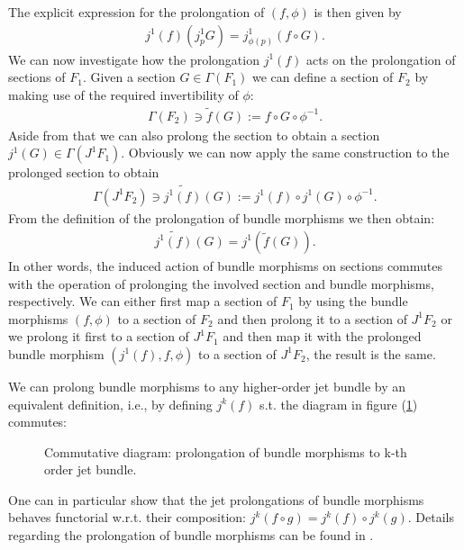 \documentclass[a4paper,12pt, DIV=14, BCOR=5mm, twoside, headsepline, numbers=noenddot]{scrbook}
\begin{document}
The explicit expression for the prolongation of $(f,\phi)$ is then given by
\begin{align}
    j^1(f)(j^1_pG) = j^1_{\phi(p)}(f\circ G).
\end{align}
We can now investigate how the prolongation $j^1(f)$ acts on the prolongation of sections of $F_1$.
Given a section $G \in \Gamma(F_1)$ we can define a section of $F_2$ by making use of the required invertibility of $\phi$: 
\begin{align}
\Gamma(F_2) \ni \widetilde{f}(G) := f \circ G \circ \phi^{-1}.
\end{align}
Aside from that we can also prolong the section to obtain a section $j^1(G) \in \Gamma(J^1F_1)$. Obviously we can now apply the same construction to the prolonged section to obtain 
\begin{align}
\Gamma(J^1F_2) \ni \widetilde{j^1(f)}(G) := j^1(f) \circ j^1(G) \circ \phi^{-1}.
\end{align}
From the definition of the prolongation of bundle morphisms we then obtain:
\begin{align}
    \widetilde{j^1(f)}(G) = j^1(\widetilde{f}(G)).
\end{align}
In other words, the induced action of bundle morphisms on sections commutes with the operation of prolonging the involved section and bundle morphisms, respectively. We can either first map a section of $F_1$ by using the bundle morphisms $(f,\phi)$ to a section of $F_2$ and then prolong it to a section of $J^1F_2$ or we prolong it first to a section of $J^1F_1$ and then map it with the prolonged bundle morphism $(j^1(f),f,\phi)$ to a section of $J^1F_2$, the result is the same.  

We can prolong bundle morphisms to any higher-order jet bundle by an equivalent definition, i.e., by defining $j^k(f)$ s.t. the diagram in figure (\ref{POrolongK}) commutes:
\begin{figure}[hbt!]
\centering
{}
\caption{Commutative diagram: prolongation of bundle morphisms to k-th order jet bundle.} \label{POrolongK}
\end{figure}
One can in particular show that the jet prolongations of bundle morphisms behaves functorial w.r.t. their composition: $j^k(f\circ g) = j^k(f) \circ j^k (g)$. Details regarding the prolongation of bundle morphisms can be found in \cite{saunders_1989}.
\end{document}
